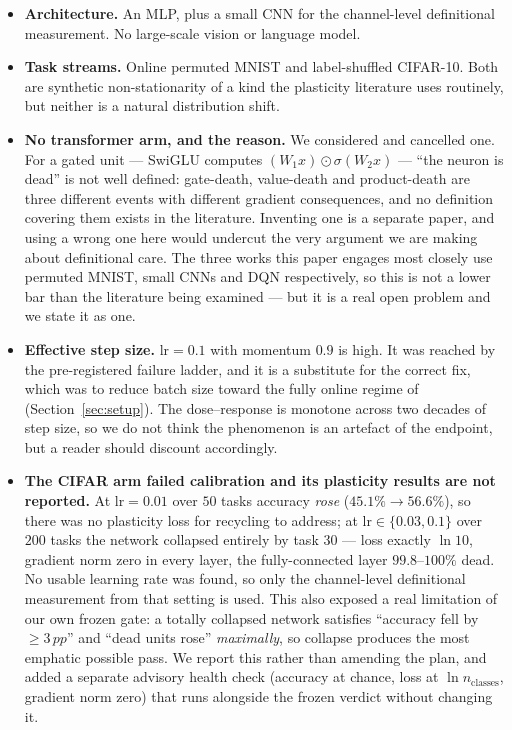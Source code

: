 \documentclass[10pt]{article}
\newcommand{\pp}{\,pp}
\begin{document}
\begin{itemize}
\item \textbf{Architecture.} An MLP, plus a small CNN for the channel-level
definitional measurement. No large-scale vision or language model.

\item \textbf{Task streams.} Online permuted MNIST and label-shuffled CIFAR-10.
Both are synthetic non-stationarity of a kind the plasticity literature uses
routinely, but neither is a natural distribution shift.

\item \textbf{No transformer arm, and the reason.} We considered and cancelled
one. For a gated unit --- SwiGLU computes
$(W_1x) \odot \sigma(W_2 x)$ --- ``the neuron is dead'' is not well defined:
gate-death, value-death and product-death are three different events with
different gradient consequences, and no definition covering them exists in the
literature. Inventing one is a separate paper, and using a wrong one here would
undercut the very argument we are making about definitional care. The three
works this paper engages most closely use permuted MNIST, small CNNs and DQN
respectively, so this is not a lower bar than the literature being examined ---
but it is a real open problem and we state it as one.

\item \textbf{Effective step size.} $\text{lr}=0.1$ with momentum $0.9$ is high.
It was reached by the pre-registered failure ladder, and it is a substitute for
the correct fix, which was to reduce batch size toward the fully online regime of
\citet{dohare2024loss} (Section~\ref{sec:setup}). The dose--response is monotone
across two decades of step size, so we do not think the phenomenon is an artefact
of the endpoint, but a reader should discount accordingly.

\item \textbf{The CIFAR arm failed calibration and its plasticity results are
not reported.} At $\text{lr}=0.01$ over $50$ tasks accuracy \emph{rose}
($45.1\% \to 56.6\%$), so there was no plasticity loss for recycling to address;
at $\text{lr} \in \{0.03, 0.1\}$ over $200$ tasks the network collapsed entirely
by task $30$ --- loss exactly $\ln 10$, gradient norm zero in every layer, the
fully-connected layer $99.8$--$100\%$ dead. No usable learning rate was found,
so only the channel-level definitional measurement from that setting is used.
This also exposed a real limitation of our own frozen gate: a totally collapsed
network satisfies ``accuracy fell by $\ge 3\pp$'' and ``dead units rose''
\emph{maximally}, so collapse produces the most emphatic possible pass. We
report this rather than amending the plan, and added a separate advisory health
check (accuracy at chance, loss at $\ln n_{\text{classes}}$, gradient norm zero)
that runs alongside the frozen verdict without changing it.


\end{itemize}
\end{document}
